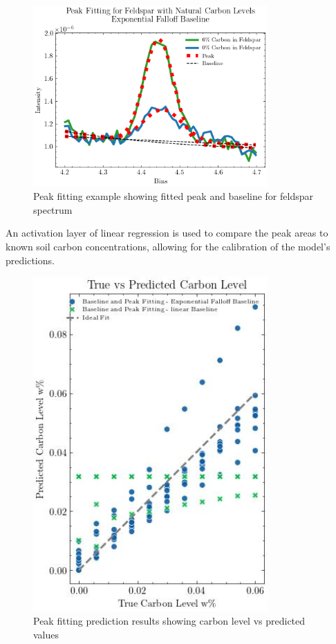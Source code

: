\documentclass[review]{elsarticle}
\begin{document}
\begin{figure}[H]
\centering
\includegraphics[width=0.8\textwidth]{../Figures/Analysis/peak_fitting_feldspar.png}
\caption{Peak fitting example showing fitted peak and baseline for feldspar spectrum}
\label{fig:peak_fitting}
\end{figure}

An activation layer of linear regression is used to compare the peak areas to known soil carbon concentrations, allowing for the calibration of the model's predictions.

\begin{figure}[H]
\centering
\includegraphics[width=0.8\textwidth]{../Figures/Analysis/carbon_level_vs_predicted.jpg}
\caption{Peak fitting prediction results showing carbon level vs predicted values}
\label{fig:peak_predictions}
\end{figure}
\end{document}
